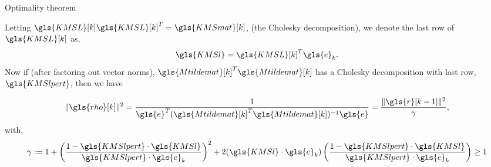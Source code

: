 \documentclass[aspectratio=169]{beamer}
\begin{document}
\begin{frame}{Optimality theorem}

    Letting $\gls{KMSL}[k]\gls{KMSL}[k]^T = \gls{KMSmat}[k]$, (the Cholesky
    decomposition), we denote the last row of $\gls{KMSL}[k]$ as,
    \begin{equation}
        \gls{KMSl} = \gls{KMSL}[k]^T \gls{e}_k.
    \end{equation}
    Now if (after factoring out vector norms), $\gls{Mtildemat}[k]^T\gls{Mtildemat}[k]$
    has a Cholesky decomposition with last row, $\gls{KMSlpert}$, then we have

    \begin{theorem}\label{thm:perturbation}
        \begin{equation}
            \|\gls{rho}[k]\|^2 =
            \frac{1}{\gls{e}^T(\gls{Mtildemat}[k]^T\gls{Mtildemat}[k])^{-1}\gls{e}} =
            \frac{\|\gls{r}[k-1]\|^2}{\gamma},
        \end{equation}
        with,
        \begin{equation}
            \gamma := 1 +
            \left(\frac{1-\gls{KMSlpert}\cdot\gls{KMSl}}{\gls{KMSlpert}\cdot\gls{e}_k}\right)^2
            +
            2(\gls{KMSl}\cdot\gls{e}_k)\left(\frac{1-\gls{KMSlpert}\cdot\gls{KMSl}}{\gls{KMSlpert}\cdot\gls{e}_k}
            \right)\geq
            1
        \end{equation}
    \end{theorem}

\end{frame}
\end{document}
